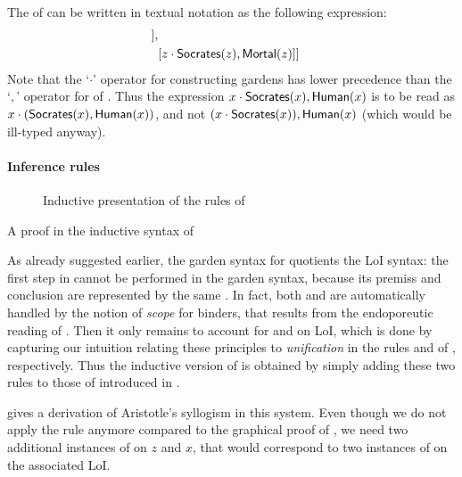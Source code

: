 \begin{scope}
\begin{scope}
\begin{example}
  The  of  can be written in textual
  notation as the following expression:
  \begin{align*}
    [&x \cdot \socrates(x),\human(x), \\
     &[y \cdot \human(y),[{} \cdot \mortal(y)]], \\
     &[z \cdot \socrates(z),\mortal(z)]]
  \end{align*}
  Note that the `$\cdot$' operator for constructing gardens has lower precedence
  than the `$,$' operator for  of . Thus the expression $x
  \cdot \mbox{\textsf{Socrates}}(x),\mbox{\textsf{Human}}(x)$ is to be read as $x \cdot
  (\mbox{\textsf{Socrates}}(x),\mbox{\textsf{Human}}(x))$, and not $(x \cdot \mbox{\textsf{Socrates}}(x)),\mbox{\textsf{Human}}(x)$ (which
  would be ill-typed anyway).
\end{example}

\paragraph{Inference rules}

\begin{figure}
  
  \caption{Inductive presentation of the rules of }
\end{figure}

\begin{marginfigure}
  
  \caption{A proof in the inductive syntax of }
\end{marginfigure}

As already suggested earlier, the garden syntax for  quotients the
LoI syntax: the first  step in 
cannot be performed in the garden syntax, because its premiss and conclusion are
represented by the same . In fact, both  and
 are automatically handled by the notion of \emph{scope} for
binders, that results from the endoporeutic reading of . Then it only
remains to account for  and  on LoI, which is done
by capturing our intuition relating these principles to \emph{unification} in
the rules  and  of , respectively.
Thus the inductive version of  is obtained by simply adding these two
rules to those of  introduced in .

 gives a derivation of Aristotle's syllogism
in this system. Even though we do not apply the  rule anymore compared
to the graphical proof of , we need two additional
instances of  on $z$ and $x$, that would correspond to two
instances of  on the associated LoI.


\end{scope}
\end{scope}
